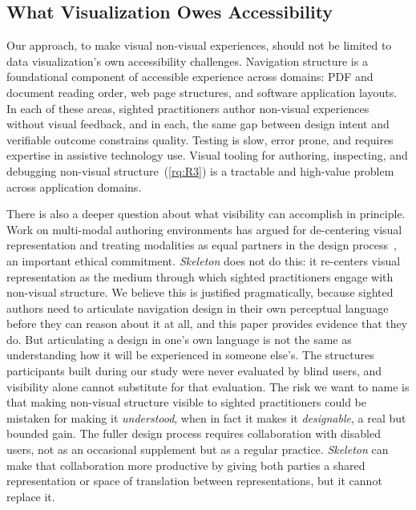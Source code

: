 \documentclass[12pt]{cmuthesis}
\begin{document}
\subsection{What Visualization Owes Accessibility}



Our approach, to make visual non-visual experiences, should not be limited to data visualization's own accessibility challenges. Navigation structure is a foundational component of accessible experience across domains: PDF and document reading order, web page structures, and software application layouts. In each of these areas, sighted practitioners author non-visual experiences without visual feedback, and in each, the same gap between design intent and verifiable outcome constrains quality. Testing is slow, error prone, and requires expertise in assistive technology use. Visual tooling for authoring, inspecting, and debugging non-visual structure~(\ref{rq:R3}) is a tractable and high-value problem across application domains.

There is also a deeper question about what visibility can accomplish in principle. Work on multi-modal authoring environments has argued for de-centering visual representation and treating modalities as equal partners in the design process~\cite{Zong2024}, an important ethical commitment. \textit{Skeleton} does not do this: it re-centers visual representation as the medium through which sighted practitioners engage with non-visual structure. We believe this is justified pragmatically, because sighted authors need to articulate navigation design in their own perceptual language before they can reason about it at all, and this paper provides evidence that they do. But articulating a design in one's own language is not the same as understanding how it will be experienced in someone else's. The structures participants built during our study were never evaluated by blind users, and visibility alone cannot substitute for that evaluation. The risk we want to name is that making non-visual structure visible to sighted practitioners could be mistaken for making it \textit{understood}, when in fact it makes it \textit{designable}, a real but bounded gain. The fuller design process requires collaboration with disabled users, not as an occasional supplement but as a regular practice. \textit{Skeleton} can make that collaboration more productive by giving both parties a shared representation or space of translation between representations, but it cannot replace it.
\end{document}
